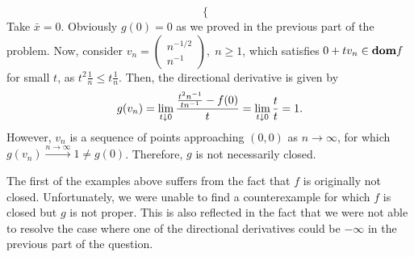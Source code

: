 \documentclass[10pt]{article}
\begin{document}
\begin{Exercise}
\begin{enumerate}
\[\begin{cases}
            \end{cases}
        \]
        Take $\bar{x} = 0$. Obviously $g(0) = 0$ as we proved in the previous
        part of the problem. Now, consider $v_n = \begin{pmatrix}
        n^{-1/2} \\ n^{-1}
        \end{pmatrix}, \; n \geq 1$, which satisfies $0 + t v_n
        \in \textbf{dom} f$ for small $t$, as $t^2 \frac{1}{n} \leq t \frac{1}{n}$.
        Then, the directional derivative is given by
        \[
            g(v_n) = \lim_{t \downarrow 0} \frac{\frac{t^2 n^{-1}}{t n^{-1}} -
            f(0)}{t}
            = \lim_{t \downarrow 0} \frac{t}{t} = 1.
        \]
        However, $v_n$ is a sequence of points approaching $(0, 0)$ as $n \to
        \infty$, for which $g(v_n) \overset{n \to \infty}{\to} 1 \neq g(0)$.
        Therefore, $g$ is not necessarily closed.
    \end{enumerate}
    The first of the examples above suffers from the fact that $f$ is originally
    not closed. Unfortunately, we were unable to find a counterexample for which
    $f$ is closed but $g$ is not proper. This is also reflected in the fact that
    we were not able to resolve the case where one of the directional
    derivatives could be $-\infty$ in the previous part of the question.
\end{Exercise}

\vspace{1em}
\end{document}
